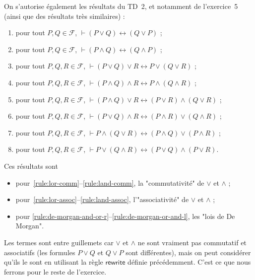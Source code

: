 \documentclass{../../notes}
\begin{document}
  On s'autorise également les résultats du TD~2, et notamment de l'exercice~5 (ainsi que des résultats très similaires) :
  \begin{enumerate}
    \item pour tout $P, Q \in \mathcal{F}$, $\vdash (P \lor Q) \leftrightarrow (Q \lor P)$ ; \label{rule:lor-comm}
    \item pour tout $P, Q \in \mathcal{F}$, $\vdash (P \land Q) \leftrightarrow (Q \land P)$ ; \label{rule:land-comm}
    \item pour tout $P, Q, R \in \mathcal{F}$, $\vdash (P \lor Q) \lor R \leftrightarrow P \lor (Q \lor R)$ ; \label{rule:lor-assoc}
    \item pour tout $P, Q, R \in \mathcal{F}$, $\vdash (P \land Q) \land R \leftrightarrow P \land (Q \land R)$ ; \label{rule:land-assoc}
    \item pour tout $P, Q, R \in \mathcal{F}$, $\vdash (P \land Q) \lor R \leftrightarrow (P \lor R) \land (Q \lor R)$ ; \label{rule:de-morgan-and-or-r}
    \item pour tout $P, Q, R \in \mathcal{F}$, $\vdash (P \lor Q) \land R \leftrightarrow (P \land R) \lor (Q \land R)$ ; \label{rule:de-morgan-or-and-r}
    \item pour tout $P, Q, R \in \mathcal{F}$, $\vdash P \land (Q \lor R) \leftrightarrow (P \land Q) \lor (P \land R)$ ; \label{rule:de-morgan-and-or-l}
    \item pour tout $P, Q, R \in \mathcal{F}$, $\vdash P \lor (Q \land R) \leftrightarrow (P \lor Q) \land (P \lor R)$. \label{rule:de-morgan-or-and-l}
  \end{enumerate}
  Ces résultats sont
  \begin{itemize}
    \item pour~\ref{rule:lor-comm}--\ref{rule:land-comm}, la "commutativité" de $\lor$ et $\land$ ;
    \item pour~\ref{rule:lor-assoc}--\ref{rule:land-assoc}, l'"associativité" de $\lor$ et $\land$ ;
    \item pour \ref{rule:de-morgan-and-or-r}--\ref{rule:de-morgan-or-and-l}, les "lois de De Morgan".
  \end{itemize}
  Les termes sont entre guillemets car $\lor$ et  $\land$ ne sont vraiment pas commutatif et associatifs (les formules $P \lor Q$ et  $Q \lor P$ sont différentes), mais on peut considérer qu'ils le sont en utilisant la règle  $\mathsf{rewrite}$ définie précédemment.
  C'est ce que nous ferrons pour le reste de l'exercice.
\end{document}
